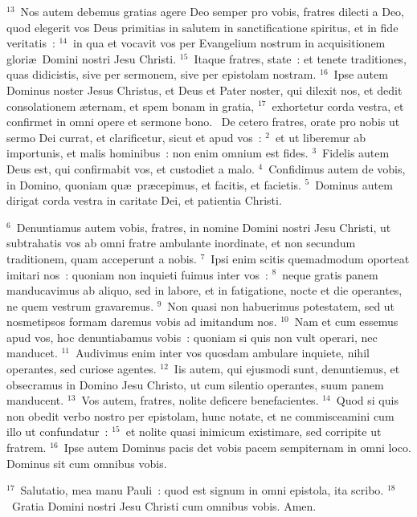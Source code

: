 ${}^{13}$~Nos autem debemus gratias agere Deo semper pro vobis, fratres dilecti a Deo, quod elegerit vos Deus primitias in salutem in sanctificatione spiritus, et in fide veritatis~:
${}^{14}$~in qua et vocavit vos per Evangelium nostrum in acquisitionem glori\ae\ Domini nostri Jesu Christi.
${}^{15}$~Itaque fratres, state~: et tenete traditiones, quas didicistis, sive per sermonem, sive per epistolam nostram.
${}^{16}$~Ipse autem Dominus noster Jesus Christus, et Deus et Pater noster, qui dilexit nos, et dedit consolationem \ae ternam, et spem bonam in gratia,
${}^{17}$~exhortetur corda vestra, et confirmet in omni opere et sermone bono.
~\lettrine[lines=10,image=true,loversize=0.05,lraise=-0.03]{D}{}e cetero fratres, orate pro nobis ut sermo Dei currat, et clarificetur, sicut et apud vos~:
${}^{2}$~et ut liberemur ab importunis, et malis hominibus~: non enim omnium est fides.
${}^{3}$~Fidelis autem Deus est, qui confirmabit vos, et custodiet a malo.
${}^{4}$~Confidimus autem de vobis, in Domino, quoniam qu\ae\ pr\ae cepimus, et facitis, et facietis.
${}^{5}$~Dominus autem dirigat corda vestra in caritate Dei, et patientia Christi.


${}^{6}$~Denuntiamus autem vobis, fratres, in nomine Domini nostri Jesu Christi, ut subtrahatis vos ab omni fratre ambulante inordinate, et non secundum traditionem, quam acceperunt a nobis.
${}^{7}$~Ipsi enim scitis quemadmodum oporteat imitari nos~: quoniam non inquieti fuimus inter vos~:
${}^{8}$~neque gratis panem manducavimus ab aliquo, sed in labore, et in fatigatione, nocte et die operantes, ne quem vestrum gravaremus.
${}^{9}$~Non quasi non habuerimus potestatem, sed ut nosmetipsos formam daremus vobis ad imitandum nos.
${}^{10}$~Nam et cum essemus apud vos, hoc denuntiabamus vobis~: quoniam si quis non vult operari, nec manducet.
${}^{11}$~Audivimus enim inter vos quosdam ambulare inquiete, nihil operantes, sed curiose agentes.
${}^{12}$~Iis autem, qui ejusmodi sunt, denuntiemus, et obsecramus in Domino Jesu Christo, ut cum silentio operantes, suum panem manducent.
${}^{13}$~Vos autem, fratres, nolite deficere benefacientes.
${}^{14}$~Quod si quis non obedit verbo nostro per epistolam, hunc notate, et ne commisceamini cum illo ut confundatur~:
${}^{15}$~et nolite quasi inimicum existimare, sed corripite ut fratrem.
${}^{16}$~Ipse autem Dominus pacis det vobis pacem sempiternam in omni loco. Dominus sit cum omnibus vobis.


${}^{17}$~Salutatio, mea manu Pauli~: quod est signum in omni epistola, ita scribo.
${}^{18}$~Gratia Domini nostri Jesu Christi cum omnibus vobis. Amen.
